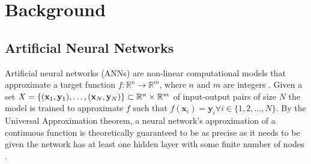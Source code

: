 \chapter{Background}
\label{ch1}

\minitoc 

\section{Artificial Neural Networks}
Artificial neural networks (ANNs) are non-linear computational models that approximate 
a target function   $f: \mathbb{R}^n \rightarrow \mathbb{R}^m$, where $n$ and $m$ are 
integers \cite{Bis:06}. Given a set $X = \{ (\mathbf{x}_1, \mathbf{y}_1), \ldots, (\mathbf{x}_N,
 \mathbf{y}_N) \} \subset \mathbb R^n \times \mathbb R^m$ of input-output pairs of size $N$ the model is 
 trained to approximate $f$ such that $f(\mathbf{x}_i) = \mathbf{y}_i \forall i \in \{1, 2, 
 \ldots, N\}$. By the Universal Approximation theorem, a neural network's approximation of a 
 continuous function is theoretically guaranteed to be as precise as it needs to be given the 
 network has at least one hidden layer with some finite number of nodes \cite{HorStiWhi:89}. 

